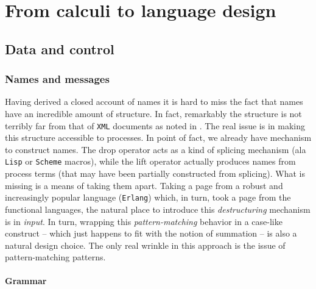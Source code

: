 \part{From calculi to language design}
\chapter{Data and control}
\section{Names and messages}

Having derived a closed account of names it is hard to miss the fact
that names have an incredible amount of structure. In fact, remarkably
the structure is not terribly far from that of \texttt{XML} documents
as noted in \cite{}. The real issue is in making this structure
accessible to processes. In point of fact, we already have mechanism
to construct names. The drop operator acts as a kind of splicing
mechanism (ala \texttt{Lisp} or \texttt{Scheme} macros), while the
lift operator actually produces names from process terms (that may
have been partially constructed from splicing). What is missing is a
means of taking them apart. Taking a page from a robust and
increasingly popular language (\texttt{Erlang}) which, in turn, took a
page from the functional languages, the natural place to introduce
this \emph{destructuring} mechanism is in \emph{input}. In turn,
wrapping this \emph{pattern-matching} behavior in a case-like
construct -- which just happens to fit with the notion of summation --
is also a natural design choice. The only real wrinkle in this
approach is the issue of pattern-matching patterns.

\subsection{Grammar}

